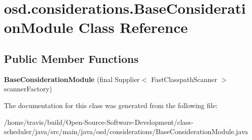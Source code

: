 \hypertarget{classosd_1_1considerations_1_1_base_consideration_module}{\section{osd.\-considerations.\-Base\-Consideration\-Module Class Reference}
\label{classosd_1_1considerations_1_1_base_consideration_module}
}
\subsection*{Public Member Functions}
\begin{DoxyCompactItemize}
\item 
\hypertarget{classosd_1_1considerations_1_1_base_consideration_module_a5788b3ed1c5e8e994d4a222295b793cc}{{\bfseries Base\-Consideration\-Module} (final Supplier$<$ Fast\-Classpath\-Scanner $>$ scanner\-Factory)}\label{classosd_1_1considerations_1_1_base_consideration_module_a5788b3ed1c5e8e994d4a222295b793cc}

\end{DoxyCompactItemize}


The documentation for this class was generated from the following file\-:\begin{DoxyCompactItemize}
\item 
/home/travis/build/\-Open-\/\-Source-\/\-Software-\/\-Development/class-\/scheduler/java/src/main/java/osd/considerations/Base\-Consideration\-Module.\-java\end{DoxyCompactItemize}
